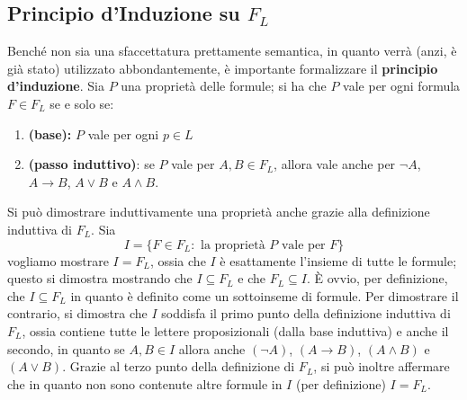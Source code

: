 \subsection{Principio d'Induzione su $F_L$}
Benché non sia una sfaccettatura prettamente semantica, in quanto verrà 
(anzi, è già stato) utilizzato abbondantemente, è importante formalizzare 
il  \textbf{principio d'induzione}. Sia 
$P$ una proprietà delle formule; si ha che 
$P$ vale per ogni formula $F \in F_L$ se e solo se: 
\begin{enumerate}
  \item \textbf{(base):} $P$ vale per ogni $p \in L$
  \item \textbf{(passo induttivo)}: se $P$ vale per $A,B  \in F_L$, allora 
    vale anche per $\neg A$, $A \rightarrow B$, $A \lor B$ e $A \land B$. 
\end{enumerate}
Si può dimostrare induttivamente una proprietà anche grazie 
alla definizione  induttiva di $F_L$. Sia 
$$
I = \{ F \in F_L : \text{ la proprietà } P \text{ vale per } F\}
$$
vogliamo mostrare $I = F_L$, ossia che $I$ è esattamente l'insieme di tutte le formule; 
questo si dimostra mostrando che $I \subseteq F_L$ e che $F_L \subseteq I$. 
\`E ovvio, per definizione, che $I \subseteq F_L$ in quanto è definito 
come un sottoinseme di formule. Per dimostrare il contrario, si dimostra che 
$I$ soddisfa il primo punto della definizione induttiva di $F_L$, ossia contiene 
tutte le lettere proposizionali (dalla base induttiva) e anche il secondo, in  quanto 
se $A,B \in I$ allora anche $(\neg A)$, $(A \rightarrow B)$, $(A \land B)$ e 
$(A \lor B)$. Grazie al terzo punto della definizione di $F_L$, si può inoltre affermare 
che in quanto non sono contenute altre formule in $I$ (per definizione) $I = F_L$.

